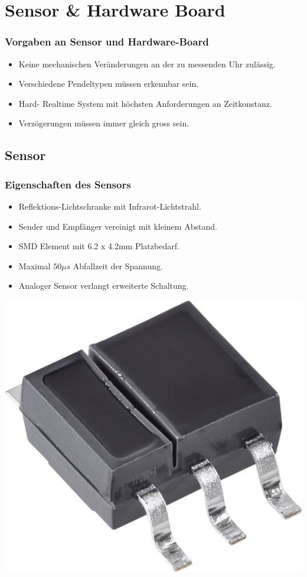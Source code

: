 \section{Sensor \& Hardware Board}
\begin{frame}
	\frametitle{Vorgaben an Sensor und Hardware-Board}
	\begin{itemize}
		\item Keine mechanischen Veränderungen an der zu messenden Uhr zulässig.
		\item Verschiedene Pendeltypen müssen erkennbar sein.
		\item Hard- Realtime System mit höchsten Anforderungen an Zeitkonstanz.
		\item Verzögerungen müssen immer gleich gross sein.
	\end{itemize}
\end{frame}

\subsection{Sensor}
\begin{frame}
	\frametitle{Eigenschaften des Sensors}
	\begin{minipage}{0.65\textwidth}
		\begin{itemize}
			\item Reflektions-Lichtschranke mit Infrarot-Lichtstrahl.
			\item Sender und Empfänger vereinigt mit kleinem Abstand.
			\item SMD Element mit 6.2 x 4.2mm Platzbedarf.
			\item Maximal $50\mu s$ Abfallzeit der Spannung.
			\item Analoger Sensor verlangt erweiterte Schaltung.
		\end{itemize}
	\end{minipage}
	\begin{minipage}[r]{0.25\textwidth}
		\centering
		\includegraphics[width=\textwidth]{../docs/images/reflexions-lichtschranke-sfh91019201-osram-1-st}
	\end{minipage}
\end{frame}

